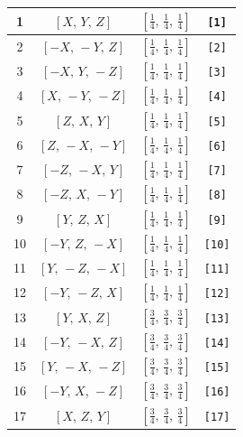 \documentclass[fleqn,8pt]{jsarticle}
\begin{document}
\begin{longtable}{cccc}
1 & $\left[ X,\, Y,\, Z \right]$ & $\left[ \frac{1}{4},\, \frac{1}{4},\, \frac{1}{4} \right]$ & {\tt [1]} \\ \hline
2 & $\left[ - X,\, - Y,\, Z \right]$ & $\left[ \frac{1}{4},\, \frac{1}{4},\, \frac{1}{4} \right]$ & {\tt [2]} \\ \hline
3 & $\left[ - X,\, Y,\, - Z \right]$ & $\left[ \frac{1}{4},\, \frac{1}{4},\, \frac{1}{4} \right]$ & {\tt [3]} \\ \hline
4 & $\left[ X,\, - Y,\, - Z \right]$ & $\left[ \frac{1}{4},\, \frac{1}{4},\, \frac{1}{4} \right]$ & {\tt [4]} \\ \hline
5 & $\left[ Z,\, X,\, Y \right]$ & $\left[ \frac{1}{4},\, \frac{1}{4},\, \frac{1}{4} \right]$ & {\tt [5]} \\ \hline
6 & $\left[ Z,\, - X,\, - Y \right]$ & $\left[ \frac{1}{4},\, \frac{1}{4},\, \frac{1}{4} \right]$ & {\tt [6]} \\ \hline
7 & $\left[ - Z,\, - X,\, Y \right]$ & $\left[ \frac{1}{4},\, \frac{1}{4},\, \frac{1}{4} \right]$ & {\tt [7]} \\ \hline
8 & $\left[ - Z,\, X,\, - Y \right]$ & $\left[ \frac{1}{4},\, \frac{1}{4},\, \frac{1}{4} \right]$ & {\tt [8]} \\ \hline
9 & $\left[ Y,\, Z,\, X \right]$ & $\left[ \frac{1}{4},\, \frac{1}{4},\, \frac{1}{4} \right]$ & {\tt [9]} \\ \hline
10 & $\left[ - Y,\, Z,\, - X \right]$ & $\left[ \frac{1}{4},\, \frac{1}{4},\, \frac{1}{4} \right]$ & {\tt [10]} \\ \hline
11 & $\left[ Y,\, - Z,\, - X \right]$ & $\left[ \frac{1}{4},\, \frac{1}{4},\, \frac{1}{4} \right]$ & {\tt [11]} \\ \hline
12 & $\left[ - Y,\, - Z,\, X \right]$ & $\left[ \frac{1}{4},\, \frac{1}{4},\, \frac{1}{4} \right]$ & {\tt [12]} \\ \hline
13 & $\left[ Y,\, X,\, Z \right]$ & $\left[ \frac{3}{4},\, \frac{3}{4},\, \frac{3}{4} \right]$ & {\tt [13]} \\ \hline
14 & $\left[ - Y,\, - X,\, Z \right]$ & $\left[ \frac{3}{4},\, \frac{3}{4},\, \frac{3}{4} \right]$ & {\tt [14]} \\ \hline
15 & $\left[ Y,\, - X,\, - Z \right]$ & $\left[ \frac{3}{4},\, \frac{3}{4},\, \frac{3}{4} \right]$ & {\tt [15]} \\ \hline
16 & $\left[ - Y,\, X,\, - Z \right]$ & $\left[ \frac{3}{4},\, \frac{3}{4},\, \frac{3}{4} \right]$ & {\tt [16]} \\ \hline
17 & $\left[ X,\, Z,\, Y \right]$ & $\left[ \frac{3}{4},\, \frac{3}{4},\, \frac{3}{4} \right]$ & {\tt [17]} \\ \hline

\end{longtable}
\end{document}
